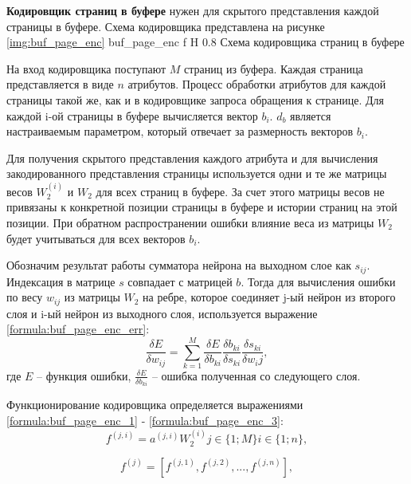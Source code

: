 \textbf{Кодировщик страниц в буфере} нужен для скрытого представления каждой страницы в буфере.
Схема кодировщика представлена на рисунке \ref{img:buf_page_enc}
{buf_page_enc} %
{f} %
{H} %
{0.8\textwidth} %
{Схема кодировщика страниц в буфере} %

На вход кодировщика поступают $M$ страниц из буфера.
Каждая страница представляется в виде $n$ атрибутов.
Процесс обработки атрибутов для каждой страницы такой же, как и в кодировщике запроса обращения к странице.
Для каждой i-ой страницы в буфере вычисляется вектор $b_i$.
$d_b$ является настраиваемым параметром, который отвечает за размерность векторов $b_i$.

Для получения скрытого представления каждого атрибута и для вычисления закодированного представления страницы используется одни и те же матрицы весов $W_2^{(i)}$ и $W_2$ для всех страниц в буфере.
За счет этого матрицы весов не привязаны к конкретной позиции страницы в буфере и истории страниц на этой позиции.
При обратном распространении ошибки влияние веса из матрицы $W_2$ будет учитываться для всех векторов $b_i$.

Обозначим результат работы сумматора нейрона на выходном слое как $s_{ij}$.
Индексация в матрице $s$ совпадает с матрицей $b$.
Тогда для вычисления ошибки по весу $w_{ij}$ из матрицы $W_2$ на ребре, которое соединяет j-ый нейрон из второго слоя и i-ый нейрон из выходного слоя, используется выражение \ref{formula:buf_page_enc_err}:
\begin{equation}\label{formula:buf_page_enc_err}
	\frac{\delta E}{\delta w_{ij}} = \sum\limits_{k=1}^{M}\frac{\delta E}{\delta b_{ki}}\frac{\delta b_{ki}}{\delta s_{ki}} \frac{\delta s_{ki}}{\delta w_ij},
\end{equation}
где $E$ -- функция ошибки, $\frac{\delta E}{\delta b_{ki}}$ -- ошибка полученная со следующего слоя.

Функционирование кодировщика определяется выражениями
\ref{formula:buf_page_enc_1} - \ref{formula:buf_page_enc_3}:
\begin{equation}\label{formula:buf_page_enc_1}
	f^{(j,i)} = a^{(j,i)}W_2^{(i)} j \in \{1;M\} i \in \{1;n\},
\end{equation}

\begin{equation}\label{formula:buf_page_enc_2}
	f^{(j)} = [f^{(j,1)}, f^{(j,2)}, ..., f^{(j,n)}],
\end{equation}

